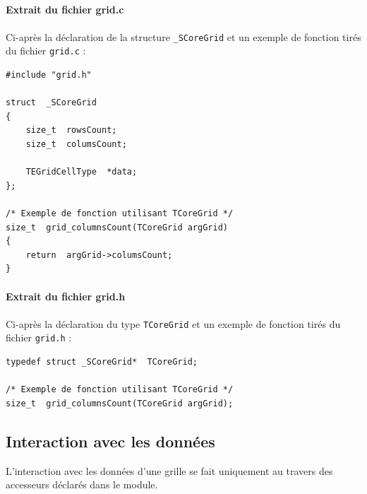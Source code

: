 \documentclass{book}
\begin{document}
\paragraph{Extrait du fichier grid.c}
\paragraph{}
Ci-après la déclaration de la structure \verb|_SCoreGrid| et un exemple de fonction tirés du fichier \verb|grid.c| :
\begin{Verbatim}
#include "grid.h"

struct  _SCoreGrid
{
	size_t  rowsCount;
	size_t  columsCount;
	
	TEGridCellType  *data;
};

/* Exemple de fonction utilisant TCoreGrid */
size_t  grid_columnsCount(TCoreGrid argGrid)
{
	return  argGrid->columsCount;
}
\end{Verbatim}


\paragraph{Extrait du fichier grid.h}
\paragraph{}
Ci-après la déclaration du type \verb|TCoreGrid| et un exemple de fonction tirés du fichier \verb|grid.h| :
\begin{Verbatim}
typedef struct _SCoreGrid*  TCoreGrid;

/* Exemple de fonction utilisant TCoreGrid */
size_t  grid_columnsCount(TCoreGrid argGrid);
\end{Verbatim}


\subsection{Interaction avec les données}

L'interaction avec les données d'une grille se fait uniquement au travers des accesseurs déclarés dans le module.
\end{document}
